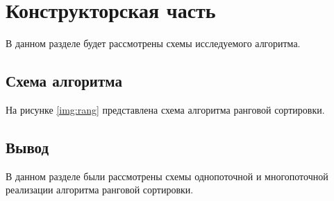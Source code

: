 \chapter{Конструкторская часть}
В данном разделе будет рассмотрены схемы исследуемого алгоритма.

\section{Схема алгоритма}

На рисунке \ref{img:rang} представлена схема алгоритма ранговой сортировки.



\section*{Вывод}

В данном разделе были рассмотрены схемы однопоточной и
многопоточной реализации алгоритма ранговой сортировки.
